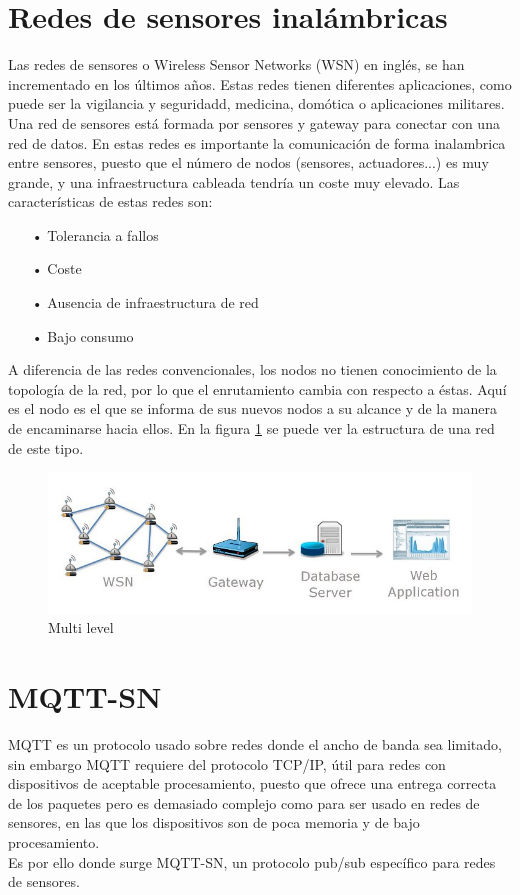 \documentclass[12pt, twoside]{book}
\begin{document}
\section{Redes de sensores inalámbricas}
Las redes de sensores o Wireless Sensor Networks (WSN) en inglés, se han incrementado en los últimos años. Estas redes tienen diferentes aplicaciones, como puede ser la vigilancia y seguridadd, medicina, domótica o aplicaciones militares. Una red de sensores está formada por sensores y gateway para conectar con una red de datos. En estas redes es importante la comunicación de forma inalambrica entre sensores, puesto que el número de nodos (sensores, actuadores...) es muy grande, y una infraestructura cableada tendría un coste muy elevado. Las características de estas redes son:
\begin{itemize}
\item[•]Tolerancia a fallos\\
\item[•]Coste\\
\item[•]Ausencia de infraestructura de red\\
\item[•]Bajo consumo
\end{itemize} 
A diferencia de las redes convencionales, los nodos no tienen conocimiento de la topología de la red, por lo que el enrutamiento cambia con respecto a éstas. Aquí es el nodo es el que se informa de sus nuevos nodos a su alcance y de la manera de encaminarse hacia ellos. En la figura \ref{L411} se puede ver la estructura de una red de este tipo.
\begin{figure}[H]
\centering
\includegraphics[scale=0.5]{images/wsn}
\caption{Multi level}\label{L411}
\end{figure}
 
\section{MQTT-SN}
MQTT es un protocolo usado sobre redes donde el ancho de banda sea limitado, sin embargo MQTT requiere del protocolo TCP/IP, útil para redes con dispositivos de aceptable procesamiento, puesto que ofrece una entrega correcta de los paquetes pero es demasiado complejo como para ser usado en redes de sensores, en las que los dispositivos son de poca memoria y de bajo procesamiento.\\
Es por ello donde surge MQTT-SN, un protocolo pub/sub específico para redes de sensores. 
\end{document}
